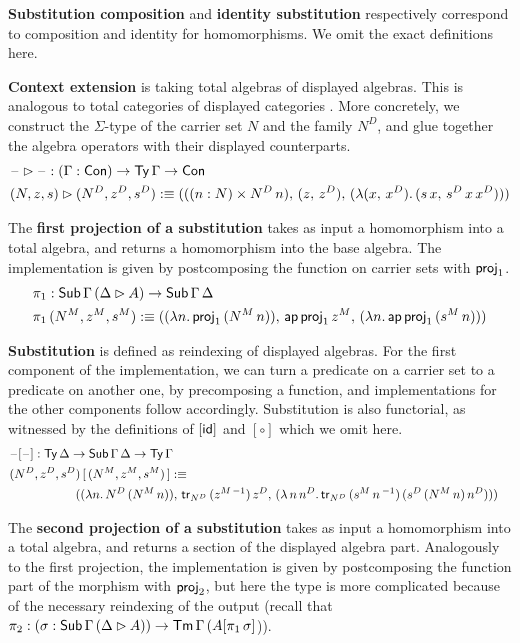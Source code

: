 \documentclass[acmsmall,review]{acmart}\settopmatter{printfolios=true,printccs=false,printacmref=false}
\begin{document}
\textbf{Substitution composition} and \textbf{identity substitution}
respectively correspond to composition and identity for
homomorphisms. We omit the exact definitions here.

\textbf{Context extension} is taking total algebras of displayed
algebras. This is analogous to total categories of displayed
categories \cite{displayedCategories}. More concretely, we construct
the $\Sigma$-type of the carrier set $N$ and the family $N^D$, and
glue together the algebra operators with their displayed counterparts.
\begin{alignat*}{5}
  & \mathord{\hspace{1pt}\text{--}\hspace{1pt}}\rhd \mathord{\hspace{1pt}\text{--}\hspace{1pt}} : (\Gamma : \mathsf{Con}) \rightarrow \mathsf{Ty}\,\Gamma \rightarrow \mathsf{Con} \\
  & (N, z, s) \rhd (N^D, z^D, s^D) :\equiv
  (((n : N) \times N^D\,n),\,(z,\,z^D),\,(\lambda (x,\,x^D).\,(s\,x,\,s^D\,x\,x^D)))
\end{alignat*}

The \textbf{first projection of a substitution} takes as input a
homomorphism into a total algebra, and returns a homomorphism into the
base algebra. The implementation is given by postcomposing the
function on carrier sets with $\mathsf{proj}_1$.
\begin{alignat*}{5}
  & \pi_1 : \mathsf{Sub}\,\Gamma\,(\Delta\rhd A)\rightarrow\mathsf{Sub}\,\Gamma\,\Delta \\
  & \pi_1\,(N^M, z^M, s^M) :\equiv ((\lambda n.\, \mathsf{proj}_1\,(N^M\,n)),\,\mathsf{ap}\,\mathsf{proj}_1\,z^M,\, (\lambda n.\,\mathsf{ap}\,\mathsf{proj}_1\,(s^M\,n)))
\end{alignat*}

\textbf{Substitution} is defined as reindexing of displayed
algebras. For the first component of the implementation, we can turn a
predicate on a carrier set to a predicate on another one, by
precomposing a function, and implementations for the other components
follow accordingly. Substitution is also functorial, as witnessed by
the definitions of $[\mathsf{id}]$ and $[\circ]$ which we omit here.
\begin{alignat*}{5}
  & \blank[\blank] : \Ty\,\Delta\ra\Tms\,\Gamma\,\Delta\ra\Ty\,\Gamma \\
  & (N^D, z^D, s^D)\,[\,(N^M, z^M, s^M)\,] :\equiv \\
  & && \hspace{-10em}
  ((\lambda n.\,N^D\,(N^M\,n)),\,\tr_{N^D}\,(z^{M\,-1})\,z^D,\,(\lambda\,n\,n^D.\,\tr_{N^D}\,(s^M\,n\,^{-1})\,(s^D\,(N^M\,n)\,n^D)))
\end{alignat*}

The \textbf{second projection of a substitution} takes as input a
homomorphism into a total algebra, and returns a section of the
displayed algebra part. Analogously to the first projection, the
implementation is given by postcomposing the function part of the
morphism with $\mathsf{proj}_2$, but here the type is more complicated because
of the necessary reindexing of the output (recall that $\pi_2 :
(\sigma:\mathsf{Sub}\,\Gamma\,(\Delta\rhd
A))\rightarrow\mathsf{Tm}\,\Gamma\,(A[\pi_1\,\sigma]$)).
\end{document}
